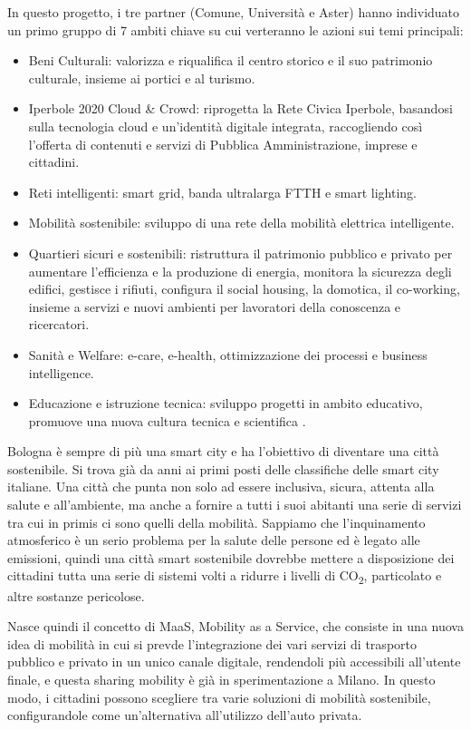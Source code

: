 In questo progetto, i tre partner (Comune, Università e Aster) hanno individuato un primo gruppo di 7 ambiti chiave su cui verteranno le azioni sui temi principali:
\begin{itemize}
    \item Beni Culturali: valorizza e riqualifica il centro storico e il suo patrimonio culturale, insieme ai portici e al turismo.
    \item Iperbole 2020 Cloud \& Crowd: riprogetta la Rete Civica Iperbole, basandosi sulla tecnologia cloud e un'identità digitale integrata, raccogliendo così l'offerta di contenuti e servizi di Pubblica Amministrazione, imprese e cittadini.
    \item Reti intelligenti: smart grid, banda ultralarga FTTH e smart lighting.
    \item Mobilità sostenibile: sviluppo di una rete della mobilità elettrica intelligente.
    \item Quartieri sicuri e sostenibili: ristruttura il patrimonio pubblico e privato per aumentare l'efficienza e la produzione di energia, monitora la sicurezza degli edifici, gestisce i rifiuti, configura il social housing, la domotica, il co-working, insieme a servizi e nuovi ambienti per lavoratori della conoscenza e ricercatori.
    \item Sanità e Welfare: e-care, e-health, ottimizzazione dei processi e business intelligence.
    \item Educazione e istruzione tecnica: sviluppo progetti in ambito educativo, promuove una nuova cultura tecnica e scientifica \cite{Bologna_Smart_City}.
\end{itemize}

Bologna è sempre di più una smart city e ha l'obiettivo di diventare una città sostenibile. Si trova già da anni ai primi posti delle classifiche delle smart city italiane. Una città che punta non solo ad essere inclusiva, sicura, attenta alla salute e all'ambiente, ma anche a fornire a tutti i suoi abitanti una serie di servizi tra cui in primis ci sono quelli della mobilità. Sappiamo che l'inquinamento atmosferico è un serio problema per la salute delle persone ed è legato alle emissioni, quindi una città smart sostenibile dovrebbe mettere a disposizione dei cittadini tutta una serie di sistemi volti a ridurre i livelli di CO\textsubscript{2}, particolato e altre sostanze pericolose.

Nasce quindi il concetto di MaaS, Mobility as a Service, che consiste in una nuova idea di mobilità in cui si prevde l'integrazione dei vari servizi di trasporto pubblico e privato in un unico canale digitale, rendendoli più accessibili all'utente finale, e questa sharing mobility è già in sperimentazione a Milano. In questo modo, i cittadini possono scegliere tra varie soluzioni di mobilità sostenibile, configurandole come un'alternativa all'utilizzo dell'auto privata.

